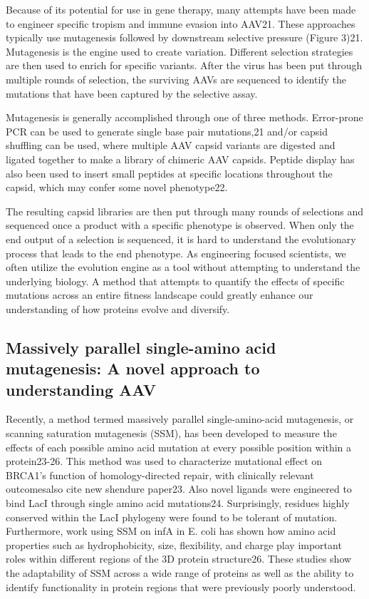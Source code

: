 Because of its potential for use in gene therapy, many attempts have been made to engineer specific tropism and immune evasion into AAV21. These approaches typically use mutagenesis followed by downstream selective pressure (Figure 3)21. Mutagenesis is the engine used to create variation. Different selection strategies are then used to enrich for specific variants.  After the virus has been put through multiple rounds of selection, the surviving AAVs are sequenced to identify the mutations that have been captured by the selective assay. 

Mutagenesis is generally accomplished through one of three methods. Error-prone PCR can be used to generate single base pair mutations,21 and/or capsid shuffling can be used, where multiple AAV capsid variants are digested and ligated together to make a library of chimeric AAV capsids. Peptide display has also been used to insert small peptides at specific locations throughout the capsid, which may confer some novel phenotype22. 

The resulting capsid libraries are then put through many rounds of selections and sequenced once a product with a specific phenotype is observed. When only the end output of a selection is sequenced, it is hard to understand the evolutionary process that leads to the end phenotype. As engineering focused scientists, we often utilize the evolution engine as a tool without attempting to understand the underlying biology. A method that attempts to quantify the effects of specific mutations across an entire fitness landscape could greatly enhance our understanding of how proteins evolve and diversify.  

\subsection{Massively parallel single-amino acid mutagenesis: A novel approach to understanding AAV}

Recently, a method termed massively parallel single-amino-acid mutagenesis, or scanning saturation mutagenesis (SSM), has been developed to measure the effects of each possible amino acid mutation at every possible position within a protein23-26. This method was used to characterize mutational effect on BRCA1’s function of homology-directed repair, with clinically relevant outcomes{also cite new shendure paper}23. Also novel ligands were engineered to bind LacI through single amino acid mutations24. Surprisingly, residues highly conserved within the LacI phylogeny were found to be tolerant of mutation. Furthermore, work using SSM on infA in E. coli has shown how amino acid properties such as hydrophobicity, size, flexibility, and charge play important roles within different regions of the 3D protein structure26. These studies show the adaptability of SSM across a wide range of proteins as well as the ability to identify functionality in protein regions that were previously poorly understood. 

